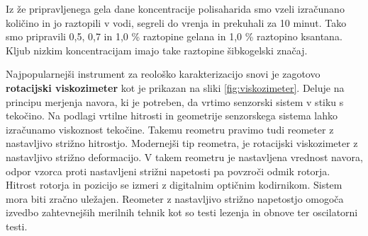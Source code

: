 \documentclass{article}
\begin{document}
Iz že pripravljenega gela dane koncentracije polisaharida smo vzeli izračunano količino in jo raztopili v vodi, segreli do vrenja in prekuhali za 10 minut. Tako smo pripravili 0,5, 0,7 in 1,0 \% raztopine gelana in 1,0 \% raztopino ksantana. Kljub nizkim koncentracijam imajo take raztopine šibkogelski značaj.

Najpopularnejši instrument za reološko karakterizacijo snovi je zagotovo \textbf{rotacijski viskozimeter} kot je prikazan na sliki \ref{fig:viskozimeter}. Deluje na principu merjenja navora, ki je potreben, da vrtimo senzorski sistem v stiku s tekočino. Na podlagi vrtilne hitrosti in geometrije senzorskega sistema lahko izračunamo viskoznost tekočine. Takemu reometru pravimo tudi reometer z nastavljivo strižno hitrostjo. Modernejši tip reometra, je rotacijski viskozimeter z nastavljivo strižno deformacijo. V takem reometru je nastavljena vrednost navora, odpor vzorca proti nastavljeni strižni napetosti pa povzroči odmik rotorja. Hitrost rotorja in pozicijo se izmeri z digitalnim optičnim kodirnikom. Sistem mora biti zračno uležajen. Reometer z nastavljivo strižno napetostjo omogoča izvedbo zahtevnejših merilnih tehnik kot so testi lezenja in obnove ter oscilatorni testi.
\end{document}
